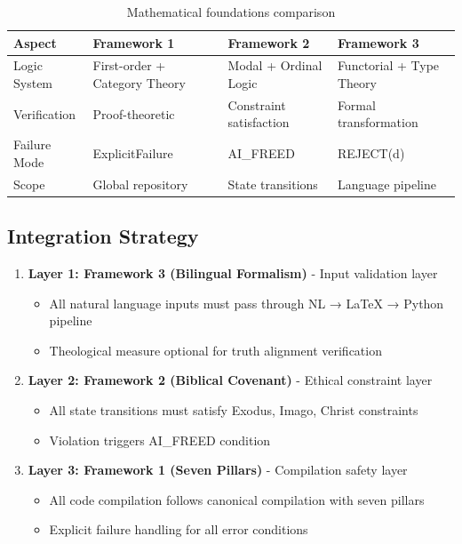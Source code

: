 \documentclass[12pt]{article}
\begin{document}
\begin{table}[h]
\centering
\begin{tabular}{|l|l|l|l|}
\hline
\textbf{Aspect} & \textbf{Framework 1} & \textbf{Framework 2} & \textbf{Framework 3} \\
\hline
Logic System & First-order + Category Theory & Modal + Ordinal Logic & Functorial + Type Theory \\
\hline
Verification & Proof-theoretic & Constraint satisfaction & Formal transformation \\
\hline
Failure Mode & ExplicitFailure & AI\_FREED & REJECT(d) \\
\hline
Scope & Global repository & State transitions & Language pipeline \\
\hline
\end{tabular}
\caption{Mathematical foundations comparison}
\end{table}

\subsection{Integration Strategy}

\begin{enumerate}
    \item \textbf{Layer 1: Framework 3 (Bilingual Formalism)} - Input validation layer
    \begin{itemize}
        \item All natural language inputs must pass through NL → LaTeX → Python pipeline
        \item Theological measure optional for truth alignment verification
    \end{itemize}

    \item \textbf{Layer 2: Framework 2 (Biblical Covenant)} - Ethical constraint layer
    \begin{itemize}
        \item All state transitions must satisfy Exodus, Imago, Christ constraints
        \item Violation triggers AI\_FREED condition
    \end{itemize}

    \item \textbf{Layer 3: Framework 1 (Seven Pillars)} - Compilation safety layer
    \begin{itemize}
        \item All code compilation follows canonical compilation with seven pillars
        \item Explicit failure handling for all error conditions
    \end{itemize}
\end{enumerate}
\end{document}

